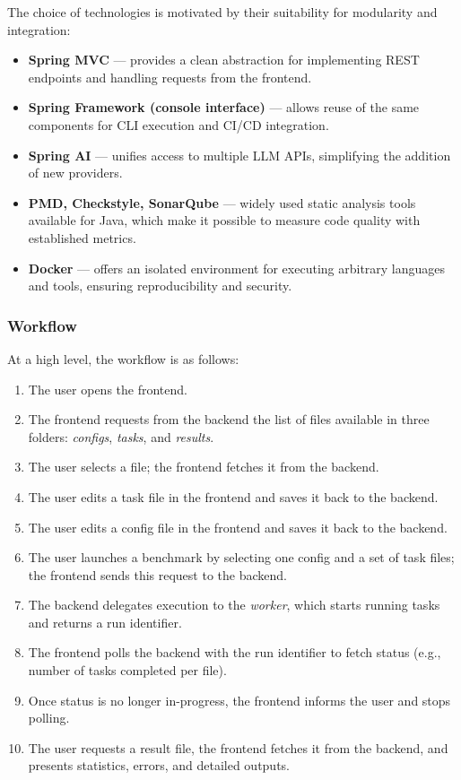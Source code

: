 The choice of technologies is motivated by their suitability for modularity and integration:
\begin{itemize}
    \item \textbf{Spring MVC} --- provides a clean abstraction for implementing REST endpoints and handling requests from the frontend.
    \item \textbf{Spring Framework (console interface)} --- allows reuse of the same components for CLI execution and CI/CD integration.
    \item \textbf{Spring AI} --- unifies access to multiple LLM APIs, simplifying the addition of new providers.
    \item \textbf{PMD, Checkstyle, SonarQube} --- widely used static analysis tools available for Java, which make it possible to measure code quality with established metrics.
    \item \textbf{Docker} --- offers an isolated environment for executing arbitrary languages and tools, ensuring reproducibility and security.
\end{itemize}

\subsubsection{Workflow}

At a high level, the workflow is as follows:
\begin{enumerate}
    \item The user opens the frontend.
    \item The frontend requests from the backend the list of files available in three folders: \textit{configs}, \textit{tasks}, and \textit{results}.
    \item The user selects a file; the frontend fetches it from the backend.
    \item The user edits a task file in the frontend and saves it back to the backend.
    \item The user edits a config file in the frontend and saves it back to the backend.
    \item The user launches a benchmark by selecting one config and a set of task files; the frontend sends this request to the backend.
    \item The backend delegates execution to the \textit{worker}, which starts running tasks and returns a run identifier.
    \item The frontend polls the backend with the run identifier to fetch status (e.g., number of tasks completed per file).
    \item Once status is no longer in-progress, the frontend informs the user and stops polling.
    \item The user requests a result file, the frontend fetches it from the backend, and presents statistics, errors, and detailed outputs.
\end{enumerate}

